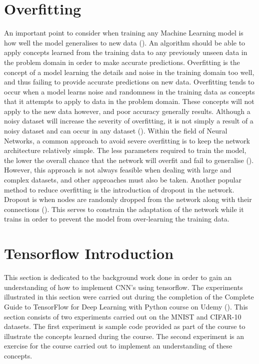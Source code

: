 \documentclass[12pt]{report}
\begin{document}
\section{Overfitting}
\begin{flushleft}
An important point to consider when training any Machine Learning model is how well the model generalises to new data (\cite{domingos2012few}). An algorithm should be able to apply concepts learned from the training data to any previously unseen data in the problem domain in order to make accurate predictions. Overfitting is the concept of a model learning the details and noise in the training domain too well, and thus failing to provide accurate predictions on new data. Overfitting tends to occur when a model learns noise and randomness in the training data as concepts that it attempts to apply to data in the problem domain. These concepts will not apply to the new data however, and poor accuracy generally results. Although a noisy dataset will increase the severity of overfitting, it is not simply a result of a noisy dataset and can occur in any dataset (\cite{domingos2012few}). Within the field of Neural Networks, a common approach to avoid severe overfitting is to keep the network architecture relatively simple. The less parameters required to train the model, the lower the overall chance that the network will overfit and fail to generalise (\cite{o2015introduction}). However, this approach is not always feasible when dealing with large and complex datasets, and other approaches must also be taken. Another popular method to reduce overfitting is the introduction of dropout in the network. Dropout is when nodes are randomly dropped from the network along with their connections (\cite{srivastava2014dropout}). This serves to constrain the adaptation of the network while it trains in order to prevent the model from over-learning the training data.
\end{flushleft}

\newpage
\section{Tensorflow Introduction}

This section is dedicated to the background work done in order to gain an understanding of how to implement CNN's using tensorflow. The experiments illustrated in this section were carried out during the completion of the Complete Guide to TensorFlow for Deep Learning with Python course on Udemy (\cite{udemy}). This section consists of two experiments carried out on the MNIST and CIFAR-10 datasets. The first experiment is sample code provided as part of the course to illustrate the concepts learned during the course. The second experiment is an exercise for the course carried out to implement an understanding of these concepts.
\end{document}
